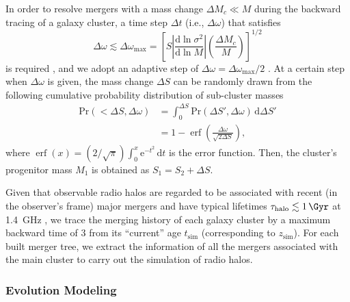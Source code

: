 \documentclass[twocolumn]{aastex62}
\newcommand{\R}[1]{\mathrm{#1}}
\newcommand{\D}[1]{\R{d} #1}
\newcommand{\diff}[2]{\frac{\D{#1}}{\D{#2}}}
\newcommand{\editone}[1]{{\leavevmode\color{cyan}#1}}
\DeclareMathOperator{\erf}{erf}
\begin{document}
In order to resolve mergers with a mass change $\Delta M_c \ll M$
during the backward tracing of a galaxy cluster, a time step $\Delta t$
(i.e., $\Delta\omega$) that satisfies
\begin{equation}
  \label{sec:dw-step}
  \Delta\omega \lesssim \Delta\omega_{\R{max}} = \left[
    S \left| \diff{\ln \sigma^2}{\ln M} \right|
    \left( \frac{\Delta M_c}{M} \right) \right]^{1/2}
\end{equation}
is required \citep{lacey1993}, and we adopt an adaptive step of
$\Delta\omega = \Delta\omega_{\R{max}} / 2$ \citep{randall2002}.
At a certain step when $\Delta\omega$ is given, the mass change
$\Delta S$ can be randomly drawn from the following cumulative
probability distribution of sub-cluster masses
\begin{align}
  \label{sec:cdf-sub-masses}
  \R{Pr}(<\!\Delta S, \Delta\omega)
    & = \int_0^{\Delta S} \R{Pr}(\Delta S', \Delta\omega) \,\D{\Delta S'} \\
    & = 1 - \erf \!\left( \frac{\Delta \omega}{\sqrt{2 \Delta S}} \right),
\end{align}
where
$\erf(x) = (2/\sqrt{\pi}) \int_0^x \R{e}^{-t^2} \,\D{t}$
is the error function.
Then, the cluster's progenitor mass $M_1$ is obtained as
$S_1 = S_2 + \Delta S$.

Given that observable radio halos are regarded to be associated
with recent (in the observer's frame) major mergers
and have typical lifetimes $\tau_{\R{halo}} \lesssim \SI{1}{\Gyr}$
at \SI{1.4}{\GHz} \citep[e.g.,][]{brunetti2009,cassano2016},
we trace the merging history of each galaxy cluster by a maximum
backward time of \SI{3}{\Gyr} from its \enquote{current} age
$t_{\R{sim}}$ (corresponding to $z_{\R{sim}}$).
For each built merger tree, we extract the information of all
the mergers associated with the main cluster to carry out the
simulation of radio halos.


\subsubsection{\editone{Evolution Modeling}}
\label{sec:halo-evo}
\end{document}
